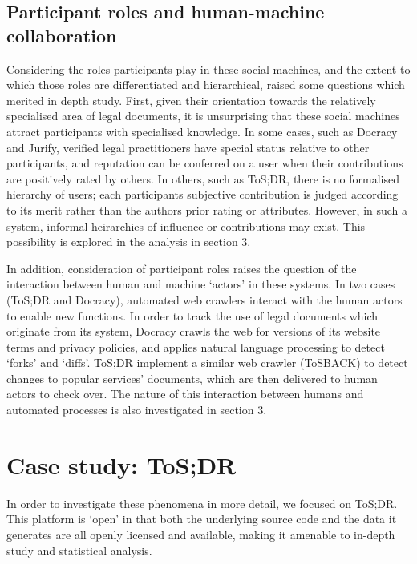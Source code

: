 \documentclass{sig-alternate}
\begin{document}
\subsection{Participant roles and human-machine collaboration}

Considering the roles participants play in these social machines, and the extent to which those roles are differentiated and hierarchical, raised some questions which merited in depth study. First, given their orientation towards the relatively specialised area of legal documents, it is unsurprising that these social machines attract participants with specialised knowledge. In some cases, such as Docracy and Jurify, verified legal practitioners have special status relative to other participants, and reputation can be conferred on a user when their contributions are positively rated by others. In others, such as ToS;DR, there is no formalised hierarchy of users; each participants subjective contribution is judged according to its merit rather than the authors prior rating or attributes. However, in such a system, informal heirarchies of influence or contributions may exist. This possibility is explored in the analysis in section 3.

In addition, consideration of participant roles raises the question of the interaction between human and machine `actors' in these systems. In two cases (ToS;DR and Docracy), automated web crawlers interact with the human actors to enable new functions. In order to track the use of legal documents which originate from its system, Docracy crawls the web for versions of its website terms and privacy policies, and applies natural language processing to detect `forks' and `diffs'. ToS;DR implement a similar web crawler (ToSBACK) to detect changes to popular services' documents, which are then delivered to human actors to check over. The nature of this interaction between humans and automated processes is also investigated in section 3.

\section{Case study: ToS;DR}

In order to investigate these phenomena in more detail, we focused on ToS;DR. This platform is `open' in that both the underlying source code and the data it generates are all openly licensed and available, making it amenable to in-depth study and statistical analysis.
\end{document}
